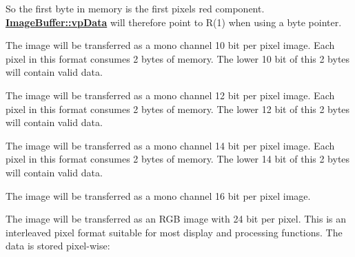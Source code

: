 \begin{Desc}
\begin{description}
So the first byte in memory is the first pixels red component. {\bfseries \hyperlink{struct_image_buffer_ab67c9c21d749e786302c848b508e0673}{Image\+Buffer\+::vp\+Data}} will therefore point to R(1) when using a byte pointer. \item[{\em 
\hypertarget{group___common_interface_gga02e0fc32ff10e0bc0f2e8b9c321d65c9aeb68c9a39753f73aebc90eb77825fd5a}{idpf\+Mono10}\label{group___common_interface_gga02e0fc32ff10e0bc0f2e8b9c321d65c9aeb68c9a39753f73aebc90eb77825fd5a}
}]The image will be transferred as a mono channel 10 bit per pixel image. Each pixel in this format consumes 2 bytes of memory. The lower 10 bit of this 2 bytes will contain valid data. \item[{\em 
\hypertarget{group___common_interface_gga02e0fc32ff10e0bc0f2e8b9c321d65c9aebd71949547ae6e795311ee57d9aabc0}{idpf\+Mono12}\label{group___common_interface_gga02e0fc32ff10e0bc0f2e8b9c321d65c9aebd71949547ae6e795311ee57d9aabc0}
}]The image will be transferred as a mono channel 12 bit per pixel image. Each pixel in this format consumes 2 bytes of memory. The lower 12 bit of this 2 bytes will contain valid data. \item[{\em 
\hypertarget{group___common_interface_gga02e0fc32ff10e0bc0f2e8b9c321d65c9a3f822e67da7573c1ff6f5e323f7ecd09}{idpf\+Mono14}\label{group___common_interface_gga02e0fc32ff10e0bc0f2e8b9c321d65c9a3f822e67da7573c1ff6f5e323f7ecd09}
}]The image will be transferred as a mono channel 14 bit per pixel image. Each pixel in this format consumes 2 bytes of memory. The lower 14 bit of this 2 bytes will contain valid data. \item[{\em 
\hypertarget{group___common_interface_gga02e0fc32ff10e0bc0f2e8b9c321d65c9a6b6514c151cdab8439ffef8b02b40218}{idpf\+Mono16}\label{group___common_interface_gga02e0fc32ff10e0bc0f2e8b9c321d65c9a6b6514c151cdab8439ffef8b02b40218}
}]The image will be transferred as a mono channel 16 bit per pixel image. \item[{\em 
\hypertarget{group___common_interface_gga02e0fc32ff10e0bc0f2e8b9c321d65c9ad1ffa0065e08593fdc5e4abc4b9e768a}{idpf\+R\+G\+B888\+Packed}\label{group___common_interface_gga02e0fc32ff10e0bc0f2e8b9c321d65c9ad1ffa0065e08593fdc5e4abc4b9e768a}
}]The image will be transferred as an R\+G\+B image with 24 bit per pixel. This is an interleaved pixel format suitable for most display and processing functions. The data is stored pixel-\/wise\+:



\end{description}
\end{Desc}
